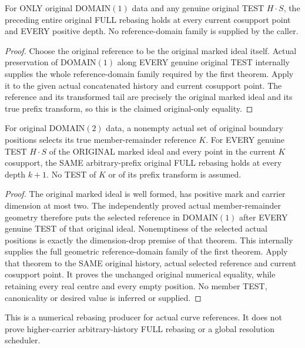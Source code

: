 \begin{theorem}
\label{hir:original-curve-full-arbitrary-prefix-rebase}
\leanok
For ONLY original DOMAIN$(1)$ data and any genuine original TEST
$H\mathbin{\cdot}S$, the preceding entire original FULL rebasing holds
at every current cosupport point and EVERY positive depth. No
reference-domain family is supplied by the caller.
\end{theorem}
\begin{proof}
Choose the original reference to be the original marked ideal itself.
Actual preservation of DOMAIN$(1)$ along EVERY genuine original TEST
internally supplies the whole reference-domain family required by the
first theorem. Apply it to the given actual concatenated history and
current cosupport point. The reference and its transformed tail are
precisely the original marked ideal and its true prefix transform, so
this is the claimed original-only equality.
\end{proof}

\begin{theorem}
\label{hir:original-positive-member-curve-full-arbitrary-prefix-rebase}
\leanok
For original DOMAIN$(2)$ data, a nonempty actual set of original boundary
positions selects its true member-remainder reference $K$. For EVERY
genuine TEST $H\mathbin{\cdot}S$ of the ORIGINAL marked ideal and every
point in the current $K$ cosupport, the SAME arbitrary-prefix original
FULL rebasing holds at every depth $k+1$. No TEST of $K$ or of its prefix
transform is assumed.
\end{theorem}
\begin{proof}
The original marked ideal is well formed, has positive mark and carrier
dimension at most two. The independently proved actual member-remainder
geometry therefore puts the selected reference in DOMAIN$(1)$ after
EVERY genuine TEST of that original ideal. Nonemptiness of the selected
actual positions is exactly the dimension-drop premise of that theorem.
This internally supplies the full geometric reference-domain family of
the first theorem. Apply that theorem to the SAME original history,
actual selected reference and current cosupport point. It proves the
unchanged original numerical equality, while retaining every real centre
and every empty position. No member TEST, canonicality or desired value
is inferred or supplied.
\end{proof}

This is a numerical rebasing producer for actual curve references. It does
not prove higher-carrier arbitrary-history FULL rebasing or a global
resolution scheduler.
